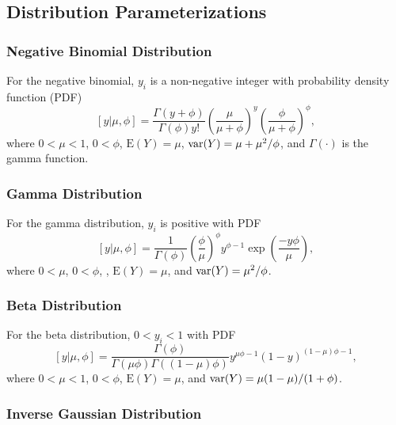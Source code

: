 \documentclass[12pt, titlepage]{article}
\begin{document}
\clearpage
\subsection{Distribution Parameterizations}

\subsubsection{Negative Binomial Distribution}

\noindent{} For the negative binomial, $y_{i}$ is a non-negative integer with probability density function (PDF)
$$
[y|\mu,\phi] = 
\frac{\Gamma(y + \phi)}{\Gamma(\phi)y!}
\left(
\frac{\mu}{\mu + \phi}
\right)^{y}
\left(
\frac{\phi}{\mu + \phi}
\right)^{\phi},
$$
where $0 < \mu < 1$, $0 < \phi$, $\textrm{E}(Y) = \mu$, $\textrm{var}(Y) = \mu + \mu^{2}/\phi$, and $\Gamma(\cdot)$ is the gamma function.

\subsubsection{Gamma Distribution}

\noindent{} For the gamma distribution, $y_{i}$ is positive with PDF
$$
[y|\mu,\phi] = \frac{1}{\Gamma(\phi)} \left(\frac{\phi}{\mu}\right)^\phi y^{\phi - 1}\exp\left(\frac{-y\phi}{\mu}\right),
$$
where $0 < \mu$, $0 < \phi$, , $\textrm{E}(Y) = \mu$, and $\textrm{var}(Y) = \mu^{2}/\phi$.{}

\subsubsection{Beta Distribution}

\noindent{} For the beta distribution, $0 < y_{i} < 1$ with PDF
$$
[y|\mu,\phi] = \frac{\Gamma(\phi)}{\Gamma(\mu\phi)\Gamma((1-\mu)\phi)}y^{\mu\phi - 1}(1 - y)^{(1-\mu)\phi - 1},
$$
where $0 < \mu < 1$, $0 < \phi$, $\textrm{E}(Y) = \mu$, and $\textrm{var}(Y) = \mu(1 - \mu)/(1 + \phi)$. 

\subsubsection{Inverse Gaussian Distribution}
\end{document}
